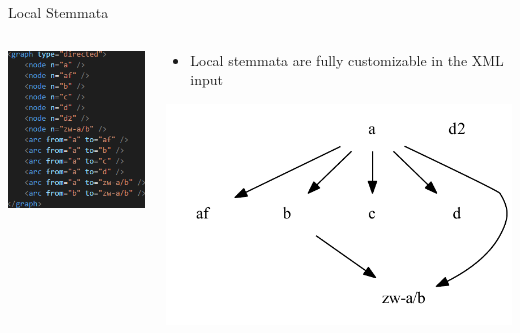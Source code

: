 \documentclass[10pt]{beamer}
\begin{document}
	\begin{frame}{Local Stemmata}
		\begin{columns}
			\begin{column}{0.4\textwidth}
				\includegraphics[scale=0.6667]{../graphics/local-stemma-xml.png}
			\end{column}
			\begin{column}{0.55\textwidth}
				\begin{itemize}
					\item Local stemmata are fully customizable in the XML input
				\end{itemize}
				\includegraphics[width=\textwidth]{../graphics/B25K1V4U22-26-local-stemma-no-legend.pdf}
			\end{column}
		\end{columns}
	\end{frame}
\end{document}
